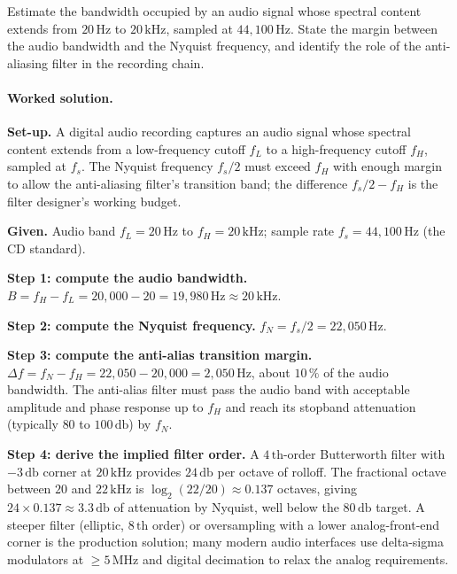 \begin{exercise}
Estimate the bandwidth occupied by an audio signal whose spectral
content extends from $20 \,\si{\hertz}$ to $20 \,\si{\kilo\hertz}$,
sampled at $44{,}100 \,\si{\hertz}$. State the margin between the
audio bandwidth and the Nyquist frequency, and identify the role
of the anti-aliasing filter in the recording chain.

\paragraph{Worked solution.}
\textbf{Set-up.} A digital audio recording captures an audio
signal whose spectral content extends from a low-frequency
cutoff $f_{L}$ to a high-frequency cutoff $f_{H}$, sampled at
$f_{s}$. The Nyquist frequency $f_{s}/2$ must exceed $f_{H}$
with enough margin to allow the anti-aliasing filter's
transition band; the difference $f_{s}/2 - f_{H}$ is the
filter designer's working budget.

\textbf{Given.} Audio band $f_{L} = 20 \,\si{\hertz}$ to $f_{H} =
20 \,\si{\kilo\hertz}$; sample rate $f_{s} = 44{,}100 \,\si
{\hertz}$ (the CD standard).

\textbf{Step 1: compute the audio bandwidth.}
$B = f_{H} - f_{L} = 20{,}000 - 20 = 19{,}980 \,\si{\hertz}
\approx 20 \,\si{\kilo\hertz}$.

\textbf{Step 2: compute the Nyquist frequency.}
$f_{N} = f_{s}/2 = 22{,}050 \,\si{\hertz}$.

\textbf{Step 3: compute the anti-alias transition margin.}
$\Delta f = f_{N} - f_{H} = 22{,}050 - 20{,}000 = 2{,}050 \,\si
{\hertz}$, about $10\,\%$ of the audio bandwidth. The anti-alias
filter must pass the audio band with acceptable amplitude and
phase response up to $f_{H}$ and reach its stopband attenuation
(typically $80$ to $100 \,\si{\decibel}$) by $f_{N}$.

\textbf{Step 4: derive the implied filter order.} A
$4\,\text{th}$-order Butterworth filter with $-3 \,\si{\decibel}$
corner at $20 \,\si{\kilo\hertz}$ provides $24 \,\si{\decibel}$
per octave of rolloff. The fractional octave between $20$ and
$22 \,\si{\kilo\hertz}$ is $\log_{2}(22/20) \approx 0.137$
octaves, giving $24 \times 0.137 \approx 3.3 \,\si{\decibel}$ of
attenuation by Nyquist, well below the $80 \,\si{\decibel}$
target. A steeper filter (elliptic, $8\,\text{th}$ order) or
oversampling with a lower analog-front-end corner is the
production solution; many modern audio interfaces use
delta-sigma modulators at $\geq 5 \,\text{MHz}$ and digital
decimation to relax the analog requirements.


\end{exercise}
